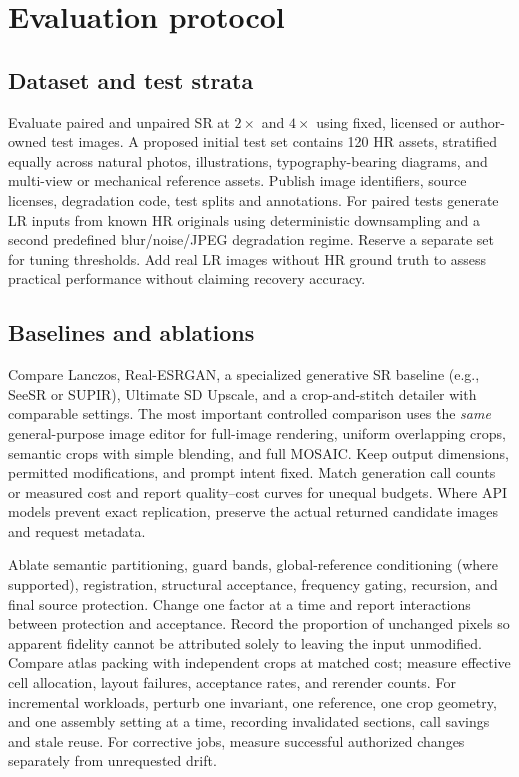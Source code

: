 \documentclass[10pt,twocolumn]{article}
\begin{document}
\section{Evaluation protocol}
\subsection{Dataset and test strata}
Evaluate paired and unpaired SR at $2\times$ and $4\times$ using fixed, licensed or author-owned test images. A proposed initial test set contains 120 HR assets, stratified equally across natural photos, illustrations, typography-bearing diagrams, and multi-view or mechanical reference assets. Publish image identifiers, source licenses, degradation code, test splits and annotations. For paired tests generate LR inputs from known HR originals using deterministic downsampling and a second predefined blur/noise/JPEG degradation regime. Reserve a separate set for tuning thresholds. Add real LR images without HR ground truth to assess practical performance without claiming recovery accuracy.

\subsection{Baselines and ablations}
Compare Lanczos, Real-ESRGAN, a specialized generative SR baseline (e.g., SeeSR or SUPIR), Ultimate SD Upscale, and a crop-and-stitch detailer with comparable settings. The most important controlled comparison uses the \emph{same} general-purpose image editor for full-image rendering, uniform overlapping crops, semantic crops with simple blending, and full MOSAIC. Keep output dimensions, permitted modifications, and prompt intent fixed. Match generation call counts or measured cost and report quality--cost curves for unequal budgets. Where API models prevent exact replication, preserve the actual returned candidate images and request metadata.

Ablate semantic partitioning, guard bands, global-reference conditioning (where supported), registration, structural acceptance, frequency gating, recursion, and final source protection. Change one factor at a time and report interactions between protection and acceptance. Record the proportion of unchanged pixels so apparent fidelity cannot be attributed solely to leaving the input unmodified. Compare atlas packing with independent crops at matched cost; measure effective cell allocation, layout failures, acceptance rates, and rerender counts. For incremental workloads, perturb one invariant, one reference, one crop geometry, and one assembly setting at a time, recording invalidated sections, call savings and stale reuse. For corrective jobs, measure successful authorized changes separately from unrequested drift.
\end{document}
